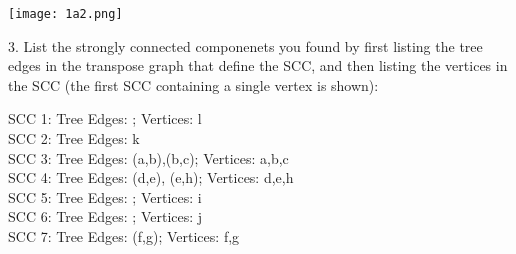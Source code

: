 \documentclass[12pt]{article}
\begin{document}
\begin{center}
\texttt{[image: 1a2.png]} \\
\end{center}
3. List the strongly connected componenets you found by first listing the tree edges in the transpose graph that define the SCC, and then listing the vertices in the SCC (the first SCC containing a single vertex is shown): \\
\linebreak
\begin{center}
SCC 1: Tree Edges: { }; Vertices: {l} \\
SCC 2: Tree Edges: {k} \\
SCC 3: Tree Edges: {(a,b),(b,c)}; Vertices: {a,b,c} \\
SCC 4: Tree Edges: {(d,e), (e,h)}; Vertices: {d,e,h} \\
SCC 5: Tree Edges: { }; Vertices: {i} \\
SCC 6: Tree Edges: { }; Vertices: {j} \\
SCC 7: Tree Edges: {(f,g)}; Vertices: {f,g} \\
\end{center}
\linebreak
\end{document}
